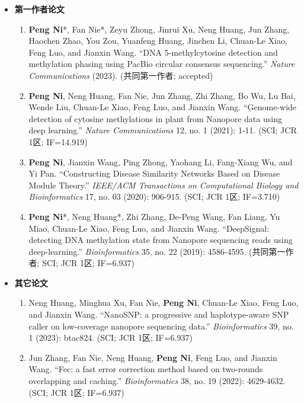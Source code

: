 \documentclass[zh]{resume}
\begin{document}
\begin{itemize}
  \item \textbf{第一作者论文}
  \begin{enumerate}
    \item \textbf{Peng Ni}*, Fan Nie*, Zeyu Zhong, Jinrui Xu, Neng Huang, Jun Zhang, Haochen Zhao, You Zou, Yuanfeng Huang, Jinchen Li, Chuan-Le Xiao, Feng Luo, and Jianxin Wang. \enquote{DNA 5-methylcytosine detection and methylation phasing using PacBio circular consensus sequencing.} {\it Nature Communications} (2023). (共同第一作者; accepted)
    \item \textbf{Peng Ni}, Neng Huang, Fan Nie, Jun Zhang, Zhi Zhang, Bo Wu, Lu Bai, Wende Liu, Chuan-Le Xiao, Feng Luo, and Jianxin Wang. \enquote{Genome-wide detection of cytosine methylations in plant from Nanopore data using deep learning.} {\it Nature Communications} 12, no. 1 (2021): 1-11. (SCI; JCR 1区; IF=14.919)
    \item \textbf{Peng Ni}, Jianxin Wang, Ping Zhong, Yaohang Li, Fang-Xiang Wu, and Yi Pan. \enquote{Constructing Disease Similarity Networks Based on Disease Module Theory.} {\it IEEE/ACM Transactions on Computational Biology and Bioinformatics} 17, no. 03 (2020): 906-915. (SCI; JCR 1区; IF=3.710)
    \item \textbf{Peng Ni}*, Neng Huang*, Zhi Zhang, De-Peng Wang, Fan Liang, Yu Miao, Chuan-Le Xiao, Feng Luo, and Jianxin Wang. \enquote{DeepSignal: detecting DNA methylation state from Nanopore sequencing reads using deep-learning.} {\it Bioinformatics} 35, no. 22 (2019): 4586-4595. (共同第一作者; SCI; JCR 1区; IF=6.937)
  \end{enumerate}
  \medskip
  \item \textbf{其它论文}
  \begin{enumerate}
    \item Neng Huang, Minghua Xu, Fan Nie, \textbf{Peng Ni}, Chuan-Le Xiao, Feng Luo, and Jianxin Wang. \enquote{NanoSNP: a progressive and haplotype-aware SNP caller on low-coverage nanopore sequencing data.} {\it Bioinformatics} 39, no. 1 (2023): btac824. (SCI; JCR 1区; IF=6.937)
    \item Jun Zhang, Fan Nie, Neng Huang, \textbf{Peng Ni}, Feng Luo, and Jianxin Wang. \enquote{Fec: a fast error correction method based on two-rounds overlapping and caching.} {\it Bioinformatics} 38, no. 19 (2022): 4629-4632. (SCI; JCR 1区; IF=6.937)

\end{enumerate}
\end{itemize}
\end{document}
